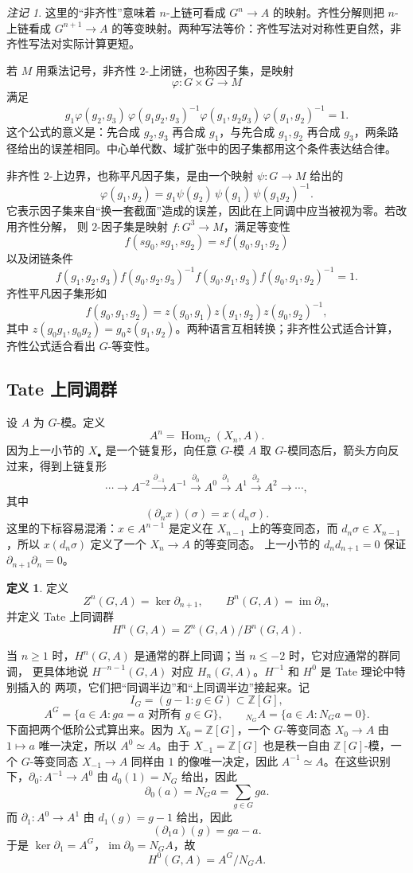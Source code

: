 \documentclass[11pt,a4paper,openany]{ctexbook}
\numberwithin{equation}{chapter}
\newcommand{\Z}{\mathbb{Z}}
\theoremstyle{plain}
\theoremstyle{definition}
\newtheorem{definition}[theorem]{定义}
\theoremstyle{remark}
\newtheorem{remark}[theorem]{注记}
\begin{document}
\begin{remark}
这里的“非齐性”意味着 $n$-上链可看成 $G^n\to A$ 的映射。齐性分解则把 $n$-上链看成 $G^{n+1}\to A$ 的等变映射。两种写法等价：齐性写法对对称性更自然，非齐性写法对实际计算更短。
\end{remark}

若 $M$ 用乘法记号，非齐性 $2$-上闭链，也称因子集，是映射
\[
 \varphi:G\times G\to M
\]
满足
\[
 g_1\varphi(g_2,g_3)\,\varphi(g_1g_2,g_3)^{-1}
 \varphi(g_1,g_2g_3)\,\varphi(g_1,g_2)^{-1}=1.
\]
这个公式的意义是：先合成 $g_2,g_3$ 再合成 $g_1$，与先合成 $g_1,g_2$ 再合成 $g_3$，两条路径给出的误差相同。中心单代数、域扩张中的因子集都用这个条件表达结合律。

非齐性 $2$-上边界，也称平凡因子集，是由一个映射 $\psi:G\to M$ 给出的
\[
\varphi(g_1,g_2)
=g_1\psi(g_2)\,\psi(g_1)\,\psi(g_1g_2)^{-1}.
\]
它表示因子集来自“换一套截面”造成的误差，因此在上同调中应当被视为零。若改用齐性分解，
则 $2$-因子集是映射 $f:G^3\to M$，满足等变性
\[
f(sg_0,sg_1,sg_2)=s f(g_0,g_1,g_2)
\]
以及闭链条件
\[
f(g_1,g_2,g_3)f(g_0,g_2,g_3)^{-1}
f(g_0,g_1,g_3)f(g_0,g_1,g_2)^{-1}=1.
\]
齐性平凡因子集形如
\[
f(g_0,g_1,g_2)=z(g_0,g_1)z(g_1,g_2)z(g_0,g_2)^{-1},
\]
其中 $z(g_0g_1,g_0g_2)=g_0z(g_1,g_2)$。两种语言互相转换；非齐性公式适合计算，
齐性公式适合看出 $G$-等变性。

\subsection{Tate 上同调群}

设 $A$ 为 $G$-模。定义
\[
 A^n=\operatorname{Hom}_G(X_n,A).
\]
因为上一小节的 $X_\bullet$ 是一个链复形，向任意 $G$-模 $A$ 取
$G$-模同态后，箭头方向反过来，得到上链复形
\[
 \cdots\to A^{-2}\xrightarrow{\partial_{-1}}A^{-1}
 \xrightarrow{\partial_0}A^0\xrightarrow{\partial_1}A^1
 \xrightarrow{\partial_2}A^2\to\cdots,
\]
其中
\[
 (\partial_nx)(\sigma)=x(d_n\sigma).
\]
这里的下标容易混淆：$x\in A^{n-1}$ 是定义在 $X_{n-1}$ 上的等变同态，而
$d_n\sigma\in X_{n-1}$，所以 $x(d_n\sigma)$ 定义了一个 $X_n\to A$ 的等变同态。
上一小节的 $d_nd_{n+1}=0$ 保证 $\partial_{n+1}\partial_n=0$。

\begin{definition}
定义
\[
 Z^n(G,A)=\ker\partial_{n+1},\qquad
 B^n(G,A)=\operatorname{im}\partial_n,
\]
并定义 Tate 上同调群
\[
 H^n(G,A)=Z^n(G,A)/B^n(G,A).
\]
\end{definition}

当 $n\ge1$ 时，$H^n(G,A)$ 是通常的群上同调；当 $n\le -2$ 时，它对应通常的群同调，
更具体地说 $H^{-n-1}(G,A)$ 对应 $H_n(G,A)$。$H^{-1}$ 和 $H^0$ 是 Tate 理论中特别插入的
两项，它们把“同调半边”和“上同调半边”接起来。记
\[
 I_G=(g-1:g\in G)\subset \Z[G],
\]
\[
 A^G=\{a\in A:ga=a\text{ 对所有 }g\in G\},
\qquad
{}_{N_G}A=\{a\in A:N_Ga=0\}.
\]
下面把两个低阶公式算出来。因为 $X_0=\Z[G]$，一个 $G$-等变同态
$X_0\to A$ 由 $1\mapsto a$ 唯一决定，所以 $A^0\simeq A$。由于
$X_{-1}=\Z[G]$ 也是秩一自由 $\Z[G]$-模，一个 $G$-等变同态
$X_{-1}\to A$ 同样由 $1$ 的像唯一决定，因此 $A^{-1}\simeq A$。在这些识别下，$\partial_0:A^{-1}\to A^0$ 由
$d_0(1)=N_G$ 给出，因此
\[
\partial_0(a)=N_Ga=\sum_{g\in G}ga.
\]
而 $\partial_1:A^0\to A^1$ 由 $d_1(g)=g-1$ 给出，因此
\[
(\partial_1a)(g)=ga-a.
\]
于是 $\ker\partial_1=A^G$，$\operatorname{im}\partial_0=N_GA$，故
\[
H^0(G,A)=A^G/N_GA.
\]
\end{document}
